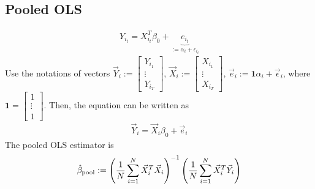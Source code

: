 \documentclass[11pt]{elegantbook}
\begin{document}
\subsection{Pooled OLS}
\begin{equation}
    \begin{aligned}
        Y_{i_t}=X_{i_t}^T\beta_0+\underbrace{e_{i_t}}_{:=\alpha_i+\epsilon_{i_t}}
    \end{aligned}
    \nonumber
\end{equation}
Use the notations of vectors $\vec{Y}_{i}:=\begin{bmatrix}
    Y_{i_1}\\
    \vdots\\
    Y_{i_T}
\end{bmatrix}$, $\vec{X}_{i}:=\begin{bmatrix}
    X_{i_1}\\
    \vdots\\
    X_{i_T}
\end{bmatrix}$, $\vec{e}_i:=\mathbf{1}\alpha_i+\vec{\epsilon}_i$, where $\mathbf{1}=\begin{bmatrix}1\\ \vdots \\ 1\end{bmatrix}$. Then, the equation can be written as
\begin{equation}
    \begin{aligned}
        \vec{Y}_i=\vec{X}_i\beta_0+\vec{e}_i
    \end{aligned}
    \nonumber
\end{equation}
The pooled OLS estimator is
\begin{equation}
    \begin{aligned}
        \hat{\beta}_\textnormal{pool}:=\left(\frac{1}{N}\sum_{i=1}^N \vec{X}_i^T \vec{X}_i\right)^{-1}\left(\frac{1}{N}\sum_{i=1}^N \vec{X}_i^T \vec{Y}_i\right)
    \end{aligned}
    \nonumber
\end{equation}
\end{document}
